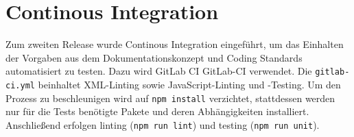 \documentclass[a4paper,11pt,oneside, titlepage]{article}
\begin{document}
\section{Continous Integration}
\label{sub:continous integration}
Zum zweiten Release wurde Continous Integration eingeführt, um das Einhalten der Vorgaben aus dem Dokumentationskonzept und Coding Standards automatisiert zu testen. Dazu wird GitLab CI \gls{GitLab-CI} verwendet. Die \verb+gitlab-ci.yml+ beinhaltet XML-Linting sowie JavaScript-Linting und -Testing. Um den Prozess zu beschleunigen wird auf \verb|npm install| verzichtet, stattdessen werden nur für die Tests benötigte Pakete und deren Abhängigkeiten installiert. Anschließend erfolgen linting (\verb|npm run lint|) und testing (\verb|npm run unit|).

\newpage
\printglossaries
\end{document}
